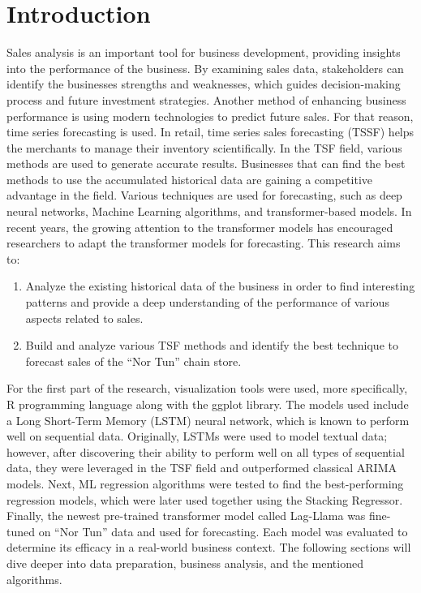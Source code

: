 \documentclass[conference]{IEEEtran}
\begin{document}

\section{Introduction}
Sales analysis is an important tool for business development, providing insights into the performance of the business. By examining sales data, stakeholders can identify the businesses strengths and weaknesses, which guides decision-making process and future investment strategies. Another method of enhancing business performance is using modern technologies to predict future sales. For that reason, time series forecasting is used. In retail, time series sales forecasting (TSSF) helps the merchants to manage their inventory scientifically.\cite{alibaba_arxiv} In the TSF field, various methods are used to generate accurate results. Businesses that can find the best methods to use the accumulated historical data are gaining a competitive advantage in the field. Various techniques are used for forecasting, such as deep neural networks, Machine Learning algorithms, and transformer-based models. In recent years, the growing attention to the transformer models has encouraged researchers to adapt the transformer models for forecasting. This research aims to:
\begin{enumerate}
    \item Analyze the existing historical data of the business in order to find interesting patterns and provide a deep understanding of the performance of various aspects related to sales.
    \item Build and analyze various TSF methods and identify the best technique to forecast sales of the ``Nor Tun'' chain store.
\end{enumerate}
For the first part of the research, visualization tools were used, more specifically, R programming language along with the ggplot library. The models used include a Long Short-Term Memory (LSTM) neural network, which is known to perform well on sequential data. Originally, LSTMs were used to model textual data; however, after discovering their ability to perform well on all types of sequential data, they were leveraged in the TSF field and outperformed classical ARIMA models. Next, ML regression algorithms were tested to find the best-performing regression models, which were later used together using the Stacking Regressor. Finally, the newest pre-trained transformer model called Lag-Llama was fine-tuned on ``Nor Tun'' data and used for forecasting. Each model was evaluated to determine its efficacy in a real-world business context. The following sections will dive deeper into data preparation, business analysis, and the mentioned algorithms.
\end{document}
